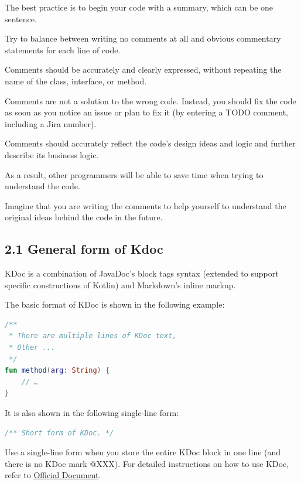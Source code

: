 The best practice is to begin your code with a summary, which can be one sentence.

Try to balance between writing no comments at all and obvious commentary statements for each line of code.

Comments should be accurately and clearly expressed, without repeating the name of the class, interface, or method.

Comments are not a solution to the wrong code. Instead, you should fix the code as soon as you notice an issue or plan to fix it (by entering a TODO comment, including a Jira number).

Comments should accurately reflect the code's design ideas and logic and further describe its business logic.

As a result, other programmers will be able to save time when trying to understand the code.

Imagine that you are writing the comments to help yourself to understand the original ideas behind the code in the future. 



\subsection*{\textbf{2.1 General form of Kdoc}}



KDoc is a combination of JavaDoc's block tags syntax (extended to support specific constructions of Kotlin) and Markdown's inline markup.

The basic format of KDoc is shown in the following example:



\begin{lstlisting}[language=Kotlin]
 /**
 * There are multiple lines of KDoc text,
 * Other ...
 */
fun method(arg: String) {
    // …
}
\end{lstlisting}


It is also shown in the following single-line form:



\begin{lstlisting}[language=Kotlin]
 /** Short form of KDoc. */
\end{lstlisting}
Use a single-line form when you store the entire KDoc block in one line (and there is no KDoc mark @XXX). For detailed instructions on how to use KDoc, refer to \href{https://docs.oracle.com/en/Kotlin/Kotlinse/11/tools/KDoc.html}{Official Document}.




